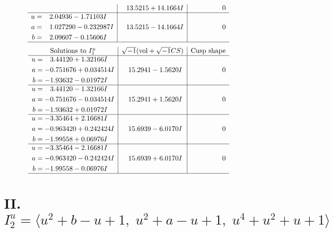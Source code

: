 \documentclass[1p]{elsarticle_modified}
\theoremstyle{definition}
\newcommand{\I}{\sqrt{-1}}
\begin{document}
$$\begin{array}{c|c|c}
 & \phantom{-}13.5215 + 14.1664 I & \phantom{-0.000000 } 0 \\ \hline\begin{aligned}
u &= \phantom{-}2.04936 - 1.71103 I \\
a &= \phantom{-}1.027290 - 0.232987 I \\
b &= \phantom{-}2.09607 - 0.15606 I\end{aligned}
 & \phantom{-}13.5215 - 14.1664 I & \phantom{-0.000000 } 0\\
 \hline 
 \end{array}$$\newpage$$\begin{array}{c|c|c}  
\text{Solutions to }I^u_{1}& \I (\text{vol} + \sqrt{-1}CS) & \text{Cusp shape}\\
 \hline 
\begin{aligned}
u &= \phantom{-}3.44120 + 1.32166 I \\
a &= -0.751676 + 0.034514 I \\
b &= -1.93632 - 0.01972 I\end{aligned}
 & \phantom{-}15.2941 - 1.5620 I & \phantom{-0.000000 } 0 \\ \hline\begin{aligned}
u &= \phantom{-}3.44120 - 1.32166 I \\
a &= -0.751676 - 0.034514 I \\
b &= -1.93632 + 0.01972 I\end{aligned}
 & \phantom{-}15.2941 + 1.5620 I & \phantom{-0.000000 } 0 \\ \hline\begin{aligned}
u &= -3.35464 + 2.16681 I \\
a &= -0.963420 + 0.242424 I \\
b &= -1.99558 + 0.06976 I\end{aligned}
 & \phantom{-}15.6939 - 6.0170 I & \phantom{-0.000000 } 0 \\ \hline\begin{aligned}
u &= -3.35464 - 2.16681 I \\
a &= -0.963420 - 0.242424 I \\
b &= -1.99558 - 0.06976 I\end{aligned}
 & \phantom{-}15.6939 + 6.0170 I & \phantom{-0.000000 } 0\\
 \hline 
 \end{array}$$\newpage\newpage\renewcommand{\arraystretch}{1}
\centering \section*{II. $I^u_{2}= \langle u^2+b- u+1,\;u^2+a- u+1,\;u^4+u^2+u+1 \rangle$}
\end{document}
